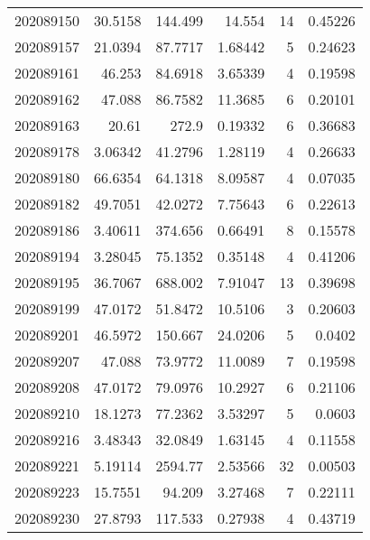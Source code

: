 \begin{tabular}{rrrrrr}
 202089150 &         30.5158  &      144.499  &           14.554   &          14 & 0.45226 \\
 202089157 &         21.0394  &       87.7717 &            1.68442 &           5 & 0.24623 \\
 202089161 &         46.253   &       84.6918 &            3.65339 &           4 & 0.19598 \\
 202089162 &         47.088   &       86.7582 &           11.3685  &           6 & 0.20101 \\
 202089163 &         20.61    &      272.9    &            0.19332 &           6 & 0.36683 \\
 202089178 &          3.06342 &       41.2796 &            1.28119 &           4 & 0.26633 \\
 202089180 &         66.6354  &       64.1318 &            8.09587 &           4 & 0.07035 \\
 202089182 &         49.7051  &       42.0272 &            7.75643 &           6 & 0.22613 \\
 202089186 &          3.40611 &      374.656  &            0.66491 &           8 & 0.15578 \\
 202089194 &          3.28045 &       75.1352 &            0.35148 &           4 & 0.41206 \\
 202089195 &         36.7067  &      688.002  &            7.91047 &          13 & 0.39698 \\
 202089199 &         47.0172  &       51.8472 &           10.5106  &           3 & 0.20603 \\
 202089201 &         46.5972  &      150.667  &           24.0206  &           5 & 0.0402  \\
 202089207 &         47.088   &       73.9772 &           11.0089  &           7 & 0.19598 \\
 202089208 &         47.0172  &       79.0976 &           10.2927  &           6 & 0.21106 \\
 202089210 &         18.1273  &       77.2362 &            3.53297 &           5 & 0.0603  \\
 202089216 &          3.48343 &       32.0849 &            1.63145 &           4 & 0.11558 \\
 202089221 &          5.19114 &     2594.77   &            2.53566 &          32 & 0.00503 \\
 202089223 &         15.7551  &       94.209  &            3.27468 &           7 & 0.22111 \\
 202089230 &         27.8793  &      117.533  &            0.27938 &           4 & 0.43719 \\

\end{tabular}
